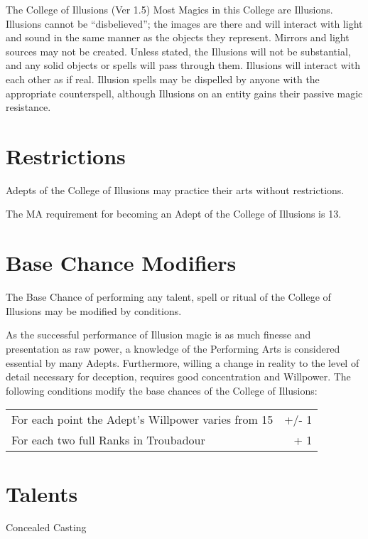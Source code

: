 \begin{Chapter}{The College of Illusions (Ver 1.5)}
Most Magics in this College are Illusions. Illusions cannot be
“disbelieved”; the images are there and will interact with light and
sound in the same manner as the objects they represent. Mirrors and
light sources may not be created.  Unless stated, the Illusions will
not be substantial, and any solid objects or spells will pass through
them.  Illusions will interact with each other as if real.  Illusion
spells may be dispelled by anyone with the appropriate counterspell,
although Illusions on an entity gains their passive magic resistance.

\section{Restrictions}

Adepts of the College of Illusions may practice their arts without
restrictions.

The MA requirement for becoming an Adept of the College of Illusions
is 13.

\section{Base Chance Modifiers}

The Base Chance of performing any talent, spell or ritual of the
College of Illusions may be modified by conditions.

As the successful performance of Illusion magic is as much finesse and
presentation as raw power, a knowledge of the Performing Arts is
considered essential by many Adepts.  Furthermore, willing a change in
reality to the level of detail necessary for deception, requires good
concentration and Willpower.  The following conditions modify the
base chances of the College of Illusions:

\begin{tabularx}{\columnwidth}{Xr}
For each point the Adept’s Willpower varies from 15	&  +/- 1 \\
For each two full Ranks in Troubadour			& + 1 \\
\end{tabularx}

\section{Talents}

\begin{talent}[T-1]{Concealed Casting}


\end{talent}
\end{Chapter}
